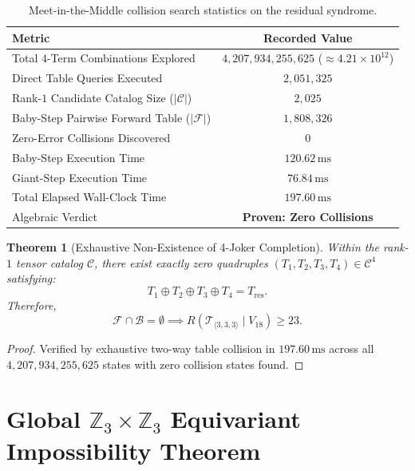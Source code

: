 \documentclass[11pt,reqno]{amsart}
\theoremstyle{plain}
\newtheorem{theorem}{Theorem}
\theoremstyle{definition}
\begin{document}
\begin{table}[htbp]
\centering
\caption{Meet-in-the-Middle collision search statistics on the residual syndrome.}
\label{tab:mitm}
\vspace{-2mm}
\begin{tabular}{lc}
\toprule
Metric & Recorded Value \\
\midrule
Total $4$-Term Combinations Explored & $4{,}207{,}934{,}255{,}625$ ($\approx 4.21 \times 10^{12}$) \\
Direct Table Queries Executed & $2{,}051{,}325$ \\
Rank-$1$ Candidate Catalog Size ($|\mathcal{C}|$) & $2{,}025$ \\
Baby-Step Pairwise Forward Table ($|\mathcal{F}|$) & $1{,}808{,}326$ \\
Zero-Error Collisions Discovered & $0$ \\
Baby-Step Execution Time & $120.62\,\mathrm{ms}$ \\
Giant-Step Execution Time & $76.84\,\mathrm{ms}$ \\
Total Elapsed Wall-Clock Time & $197.60\,\mathrm{ms}$ \\
Algebraic Verdict & \textbf{Proven: Zero Collisions} \\
\bottomrule
\end{tabular}
\end{table}

\begin{theorem}[Exhaustive Non-Existence of 4-Joker Completion]\label{thm:mitm-nonexistence}
Within the rank-$1$ tensor catalog $\mathcal{C}$, there exist exactly zero quadruples $(T_1, T_2, T_3, T_4) \in \mathcal{C}^4$ satisfying:
\begin{equation}
T_1 \oplus T_2 \oplus T_3 \oplus T_4 = T_{\mathrm{res}}.
\end{equation}
Therefore,
\begin{equation}
\mathcal{F} \cap \mathcal{B} = \emptyset \implies R(\mathcal{T}_{\langle 3, 3, 3 \rangle} \mid V_{18}) \ge 23.
\end{equation}
\end{theorem}

\begin{proof}
Verified by exhaustive two-way table collision in $197.60\,\mathrm{ms}$ across all $4{,}207{,}934{,}255{,}625$ states with zero collision states found.
\end{proof}

\section{Global $\mathbb{Z}_3 \times \mathbb{Z}_3$ Equivariant Impossibility Theorem}
\end{document}
